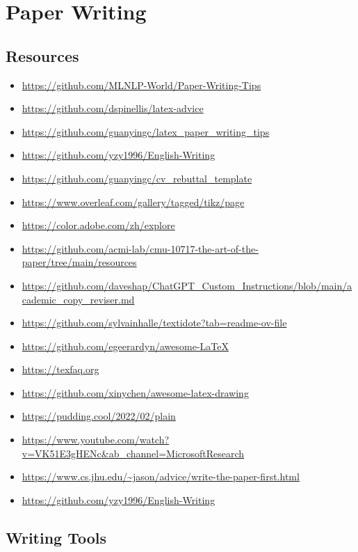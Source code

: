 \chapter{Paper Writing}\label{chp:paper_writing}
\minitoc


\section{Resources}

\begin{itemize}
	\item \url{https://github.com/MLNLP-World/Paper-Writing-Tips}
	\item \url{https://github.com/dspinellis/latex-advice}
	\item \url{https://github.com/guanyingc/latex_paper_writing_tips}
	\item \url{https://github.com/yzy1996/English-Writing}
	\item \url{https://github.com/guanyingc/cv_rebuttal_template}
	\item \url{https://www.overleaf.com/gallery/tagged/tikz/page}
	\item \url{https://color.adobe.com/zh/explore}
	\item \url{https://github.com/acmi-lab/cmu-10717-the-art-of-the-paper/tree/main/resources}
	\item \url{https://github.com/daveshap/ChatGPT_Custom_Instructions/blob/main/academic_copy_reviser.md}
	\item \url{https://github.com/sylvainhalle/textidote?tab=readme-ov-file}
	\item \url{https://github.com/egeerardyn/awesome-LaTeX}
	\item \url{https://texfaq.org}
	\item \url{https://github.com/xinychen/awesome-latex-drawing}
	\item \url{https://pudding.cool/2022/02/plain}
	\item \url{https://www.youtube.com/watch?v=VK51E3gHENc&ab_channel=MicrosoftResearch}
	\item \url{https://www.cs.jhu.edu/~jason/advice/write-the-paper-first.html}
	\item \url{https://github.com/yzy1996/English-Writing}
\end{itemize}

\section{Writing Tools}

